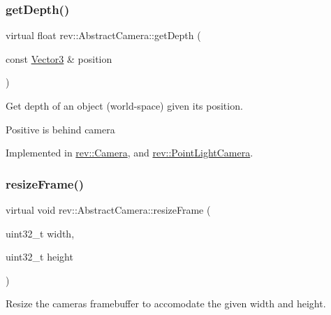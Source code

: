 \mbox{\label{classrev_1_1_abstract_camera_aad3a00ed805121a7915574b4125a343f}} 
\subsubsection{\texorpdfstring{getDepth()}{getDepth()}}
{\footnotesize\ttfamily virtual float rev\+::\+Abstract\+Camera\+::get\+Depth (\begin{DoxyParamCaption}\item[{const \mbox{\hyperlink{classrev_1_1_vector}{Vector3}} \&}]{position }\end{DoxyParamCaption})\hspace{0.3cm}{\ttfamily [pure virtual]}}



Get depth of an object (world-\/space) given its position. 

Positive is behind camera 

Implemented in \mbox{\hyperlink{classrev_1_1_camera_a3b0239e64437defa4469e3b914661ffc}{rev\+::\+Camera}}, and \mbox{\hyperlink{classrev_1_1_point_light_camera_adfa53b5dd87fb570e4d238ccafc7cd5d}{rev\+::\+Point\+Light\+Camera}}.

\mbox{\label{classrev_1_1_abstract_camera_aaa1843c3653515e93eecc2a255d32987}} 
\subsubsection{\texorpdfstring{resizeFrame()}{resizeFrame()}}
{\footnotesize\ttfamily virtual void rev\+::\+Abstract\+Camera\+::resize\+Frame (\begin{DoxyParamCaption}\item[{uint32\+\_\+t}]{width,  }\item[{uint32\+\_\+t}]{height }\end{DoxyParamCaption})\hspace{0.3cm}{\ttfamily [pure virtual]}}



Resize the camera\textquotesingle{}s framebuffer to accomodate the given width and height. 

